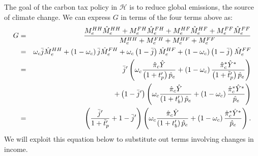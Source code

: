 \documentclass[notitlepage,12pt]{article}
\begin{document}
The goal of the carbon tax policy in $\mathcal{H}$ is to reduce global
emissions, the source of climate change. We can express $G$ in terms of the
four terms above as:%
\begin{eqnarray}
G &=&\frac{M_{e}^{HH}\hat{M}_{e}^{HH}+M_{e}^{FH}\hat{M}_{e}^{FH}+M_{e}^{HF}%
\hat{M}_{e}^{HF}+M_{e}^{FF}\hat{M}_{e}^{FF}}{%
M_{e}^{HH}+M_{e}^{FH}+M_{e}^{HF}+M_{e}^{FF}}  \notag \\
&=&\omega _{c}\bar{j}\hat{M}_{e}^{HH}+\left( 1-\omega _{c}\right) \bar{j}%
\hat{M}_{e}^{FH}+\omega _{c}\left( 1-\bar{j}\right) \hat{M}_{e}^{HF}+\left(
1-\omega _{c}\right) \left( 1-\bar{j}\right) \hat{M}_{e}^{FF}  \notag \\
&=&\bar{j}^{\prime }\left( \omega _{c}\frac{\hat{\pi}_{c}\hat{Y}}{\left(
1+t_{p}^{\prime }\right) \hat{p}_{e}}+\left( 1-\omega _{c}\right) \frac{\hat{%
\pi}_{c}^{\ast }\hat{Y}^{\ast }}{\left( 1+\tilde{t}_{p}^{\prime }\right) 
\hat{p}_{e}}\right)   \notag \\
&&+\left( 1-\bar{j}^{\prime }\right) \left( \omega _{c}\frac{\hat{\pi}_{c}%
\hat{Y}}{\left( 1+t_{b}^{\prime }\right) \hat{p}_{e}}+\left( 1-\omega
_{c}\right) \frac{\hat{\pi}_{c}^{\ast }\hat{Y}^{\ast }}{\hat{p}_{e}}\right) 
\notag \\
&=&\left( \frac{\bar{j}^{\prime }}{1+\tilde{t}_{p}^{\prime }}+1-\bar{j}%
^{\prime }\right) \left( \omega _{c}\frac{\hat{\pi}_{c}\hat{Y}}{\left(
1+t_{b}^{\prime }\right) \hat{p}_{e}}+\left( 1-\omega _{c}\right) \frac{\hat{%
\pi}_{c}^{\ast }\hat{Y}^{\ast }}{\hat{p}_{e}}\right) .  \label{G equation}
\end{eqnarray}%
We will exploit this equation below to substitute out terms involving
changes in income.
\end{document}

